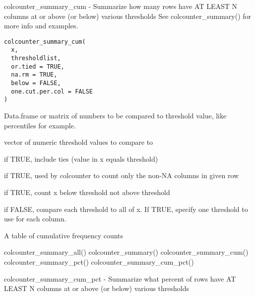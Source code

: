 \documentclass[a4paper]{book}
\begin{document}
%
\begin{Description}\relax
colcounter\_summary\_cum - Summarize how many rows have AT LEAST N columns at or above (or below) various thresholds
See colcounter\_summary() for more info and examples.
\end{Description}
%
\begin{Usage}
\begin{verbatim}
colcounter_summary_cum(
  x,
  thresholdlist,
  or.tied = TRUE,
  na.rm = TRUE,
  below = FALSE,
  one.cut.per.col = FALSE
)
\end{verbatim}
\end{Usage}
%
\begin{Arguments}
\begin{ldescription}
\item[\code{x}] Data.frame or matrix of numbers to be compared to threshold value,
like percentiles for example.

\item[\code{thresholdlist}] vector of numeric threshold values to compare to

\item[\code{or.tied}] if TRUE, include ties (value in x equals threshold)

\item[\code{na.rm}] if TRUE, used by colcounter to count only the non-NA columns in given row

\item[\code{below}] if TRUE, count x below threshold not above threshold

\item[\code{one.cut.per.col}] if FALSE, compare each threshold to all of x.
If TRUE, specify one threshold to use for each column.
\end{ldescription}
\end{Arguments}
%
\begin{Value}
A table of cumulative frequency counts
\end{Value}
%
\begin{SeeAlso}\relax
colcounter\_summary\_all() colcounter\_summary() colcounter\_summary\_cum() colcounter\_summary\_pct() colcounter\_summary\_cum\_pct()
\end{SeeAlso}
%
\begin{Description}\relax
colcounter\_summary\_cum\_pct - Summarize what percent of rows have AT LEAST N columns at or above (or below) various thresholds
\end{Description}
\end{document}
